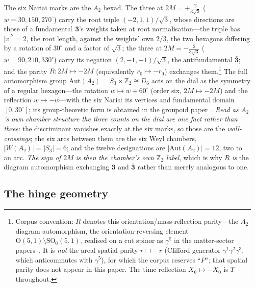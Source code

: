 \documentclass[11pt,a4paper]{article}
\theoremstyle{definition}
\begin{document}
The six Nariai marks are the $A_{2}$ hexad. The three at $2M=+\tfrac{2}{3\sqrt3}$ ($w=30,150,270^{\circ}$) carry the root triple $(-2,1,1)/\sqrt3$, whose directions are those of a fundamental $\mathbf 3$'s weights taken at root normalisation---the triple has $|v|^{2}=2$, the root length, against the weights' own $2/3$, the two hexagons differing by a rotation of $30^{\circ}$ and a factor of $\sqrt3$; the three at $2M=-\tfrac{2}{3\sqrt3}$ ($w=90,210,330^{\circ}$) carry its negation $(2,-1,-1)/\sqrt3$, the antifundamental $\bar{\mathbf 3}$; and the parity $R:2M\mapsto-2M$ (equivalently $r_{0}\mapsto-r_{0}$) exchanges them.\footnote{Corpus convention: $R$ denotes this orientation/mass-reflection parity---the $A_{2}$ diagram automorphism, the orientation-reversing element $\mathrm{O}(5,1)\setminus\mathrm{SO}_{0}(5,1)$, realised on a cut spinor as $\gamma^{5}$ in the matter-sector papers~\cite{JanzenGroupoid,JanzenBoundary}. It is \emph{not} the areal spatial parity $r\mapsto-r$ (Clifford generator $\gamma^{1}\gamma^{2}\gamma^{3}$, which anticommutes with $\gamma^{5}$), for which the corpus reserves ``$P$''; that spatial parity does not appear in this paper. The time reflection $X_{0}\mapsto-X_{0}$ is $T$ throughout.} The full automorphism group $\mathrm{Aut}(A_{2})=S_{3}\times\mathbb{Z}_{2}\cong D_{6}$ acts on the dial as the symmetry of a regular hexagon---the rotation $w\mapsto w+60^{\circ}$ (order six, $2M\mapsto-2M$) and the reflection $w\mapsto-w$---with the six Nariai its vertices and fundamental domain $[0,30^{\circ}]$; its group-theoretic form is obtained in the groupoid paper~\cite{JanzenGroupoid}. \emph{Read as $A_{2}$'s own chamber structure the three counts on the dial are one fact rather than three}: the discriminant vanishes exactly at the six marks, so those are the \emph{wall-crossings}; the six arcs between them are the six Weyl chambers, $|W(A_{2})|=|S_{3}|=6$; and the twelve designations are $|\mathrm{Aut}(A_{2})|=12$, two to an arc. \emph{The sign of $2M$ is then the chamber's own $\mathbb{Z}_{2}$ label}, which is why $R$ \emph{is} the diagram automorphism exchanging $\mathbf3$ and $\bar{\mathbf3}$ rather than merely analogous to one.

\subsection{The hinge geometry}\label{sec:hinge-geometry}
\end{document}
